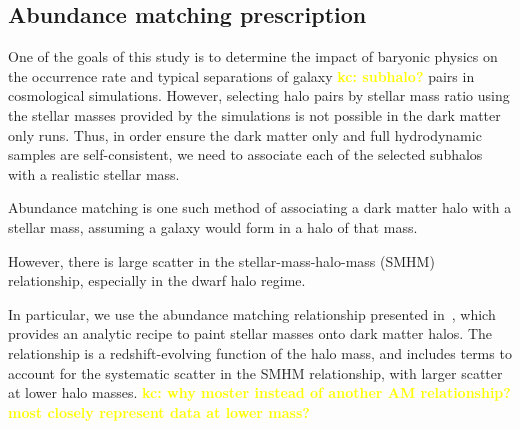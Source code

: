 \documentclass[twocolumn]{aastex631}
\newcommand{\kc}[1]{\textcolor{yellow}{\textbf{kc: #1}} }
\begin{document}



\subsection{Abundance matching prescription}\label{sec:methods-am}
One of the goals of this study is to determine the impact of baryonic physics on the occurrence rate and typical separations of galaxy \kc{subhalo?} pairs in cosmological simulations. 
However, selecting halo pairs by stellar mass ratio using the stellar masses provided by the simulations is not possible in the dark matter only runs. 
Thus, in order ensure the dark matter only and full hydrodynamic samples are self-consistent, we need to associate each of the selected subhalos with a realistic stellar mass.

Abundance matching is one such method of associating a dark matter halo with a stellar mass, assuming a galaxy would form in a halo of that mass. 

However, there is large scatter in the stellar-mass-halo-mass (SMHM) relationship, especially in the dwarf halo regime. 



In particular, we use the abundance matching relationship presented in~\citet{Moster2013}, which provides an analytic recipe to paint stellar masses onto dark matter halos. 
The~\citet{Moster2013} relationship is a redshift-evolving function of the halo mass, and includes terms to account for the systematic scatter in the SMHM relationship, with larger scatter at lower halo masses.
\kc{why moster instead of another AM relationship? most closely represent data at lower mass? }
\end{document}
